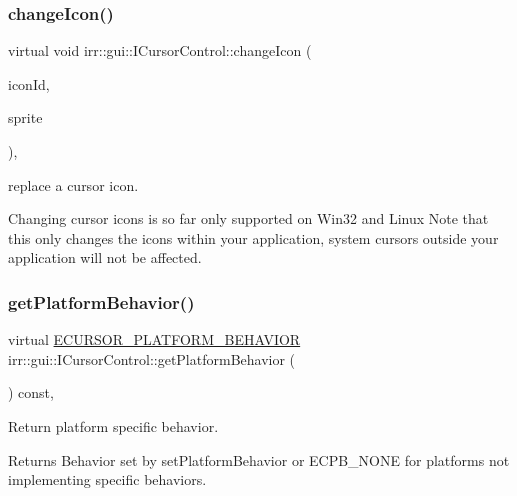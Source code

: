 \subsubsection{\texorpdfstring{change\+Icon()}{changeIcon()}}
{\footnotesize\ttfamily virtual void irr\+::gui\+::\+I\+Cursor\+Control\+::change\+Icon (\begin{DoxyParamCaption}\item[{\hyperlink{namespaceirr_1_1gui_aefee802dd632c5735703e40ef40f879b}{E\+C\+U\+R\+S\+O\+R\+\_\+\+I\+C\+ON}}]{icon\+Id,  }\item[{const \hyperlink{structirr_1_1gui_1_1SCursorSprite}{gui\+::\+S\+Cursor\+Sprite} \&}]{sprite }\end{DoxyParamCaption})\hspace{0.3cm}{\ttfamily [inline]}, {\ttfamily [virtual]}}



replace a cursor icon. 

Changing cursor icons is so far only supported on Win32 and Linux Note that this only changes the icons within your application, system cursors outside your application will not be affected. \mbox{\label{classirr_1_1gui_1_1ICursorControl_aad19b5b02de0b8bc476c66b152b745c4}} 
\subsubsection{\texorpdfstring{get\+Platform\+Behavior()}{getPlatformBehavior()}}
{\footnotesize\ttfamily virtual \hyperlink{namespaceirr_1_1gui_abbd186f9cfba2f805d98248df226acef}{E\+C\+U\+R\+S\+O\+R\+\_\+\+P\+L\+A\+T\+F\+O\+R\+M\+\_\+\+B\+E\+H\+A\+V\+I\+OR} irr\+::gui\+::\+I\+Cursor\+Control\+::get\+Platform\+Behavior (\begin{DoxyParamCaption}{ }\end{DoxyParamCaption}) const\hspace{0.3cm}{\ttfamily [inline]}, {\ttfamily [virtual]}}



Return platform specific behavior. 

\begin{DoxyReturn}{Returns}
Behavior set by set\+Platform\+Behavior or E\+C\+P\+B\+\_\+\+N\+O\+NE for platforms not implementing specific behaviors. 
\end{DoxyReturn}
\mbox{\label{classirr_1_1gui_1_1ICursorControl_a65d9f6e734baa02be69b7e9f5fbdd565}} 
